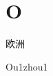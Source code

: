 ﻿%
\section*{O}

\begin{verbete}[Ou1zhou1]{欧洲}
\begin{pronuncia}{Ou1zhou1}
\end{pronuncia}
\end{verbete}

